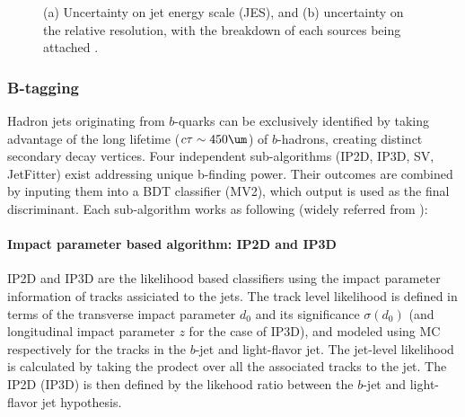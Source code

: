\begin{figure}[h]
  \centering
    \caption{ (a) Uncertainty on jet energy scale (JES), and (b) uncertainty on the relative resolution, with the breakdown of each sources being attached \cite{144_JESmeas_2015data}.
      \label{fig::objDef::JERUnct2015_pt_144} }
\end{figure}



\subsubsection{B-tagging} \label{sec::objDef::jets::btag}
Hadron jets originating from $b$-quarks can be exclusively identified 
by taking advantage of the long lifetime ($c\tau\sim 450\um$) of $b$-hadrons,
creating distinct secondary decay vertices. 
Four independent sub-algorithms (IP2D, IP3D, SV, JetFitter) exist addressing unique b-finding power. 
Their outcomes are combined by inputing them into a BDT classifier (MV2), which output is used as the final discriminant. Each sub-algorithm works as following (widely referred from \cite{150_bTag_Run2_exp} \cite{151_bTag_Run2_perf} \cite{bTag_Run2_2015data}): 

\paragraph{Impact parameter based algorithm: IP2D and IP3D}
IP2D and IP3D are the likelihood based classifiers using the impact parameter information of tracks assiciated to the jets. 
The track level likelihood is defined in terms of the transverse impact parameter $d_0$ and its significance $\sigma(d_0)$ (and longitudinal impact parameter $z$ for the case of IP3D), and modeled using MC respectively for the tracks in the $b$-jet and light-flavor jet. The jet-level likelihood is calculated by taking the prodect over all the associated tracks to the jet.
The IP2D (IP3D) is then defined by the likehood ratio between the $b$-jet and light-flavor jet hypothesis.


